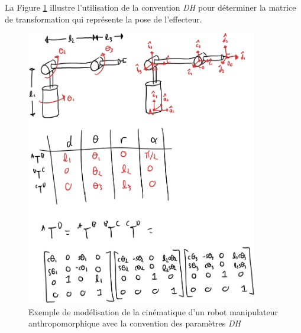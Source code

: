


\begin{example}
\label{sec:dhex}

La Figure \ref{fig:dh3} illustre l'utilisation de la convention \textit{DH} pour déterminer la matrice de transformation qui représente la pose de l'effecteur. 

\begin{figure}[H]
	\centering
		\includegraphics[width=0.90\textwidth]{fig/dh3.jpg}
	\caption{Exemple de modélisation de la cinématique d'un robot manipulateur anthropomorphique avec la convention des paramètres \textit{DH}}
	\label{fig:dh3}
\end{figure}


\end{example}
